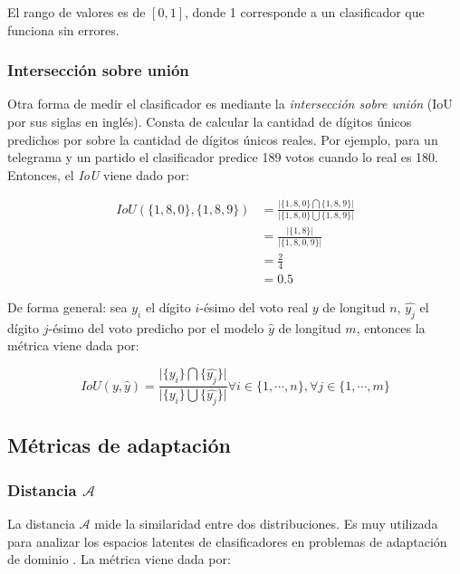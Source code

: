 \noindent
El rango de valores es de $[0, 1]$, donde 1 corresponde a un clasificador que funciona sin errores.

\subsubsection{Intersección sobre unión}

Otra forma de medir el clasificador es mediante la {\it intersección sobre unión} (IoU por sus siglas en inglés).
Consta de calcular la cantidad de dígitos únicos predichos por sobre la cantidad de dígitos únicos reales. Por ejemplo,
para un telegrama y un partido el clasificador predice 189 votos cuando lo real es 180. Entonces, el {\it IoU} viene
dado por:

\begin{align}
    IoU(\{1, 8, 0\}, \{1, 8, 9\}) & = \frac{\lvert\{1, 8, 0\} \bigcap \{1, 8, 9\}\rvert}{\lvert\{1, 8, 0\} \bigcup \{1, 8, 9\}\rvert} \nonumber \\
                                  & = \frac{\lvert\{1, 8\}\rvert}{\lvert\{1, 8, 0, 9\}\rvert}                                         \nonumber \\
                                  & = \frac{2}{4}                                                                     \nonumber                 \\
                                  & = 0.5
\end{align}

\noindent
De forma general: sea $y_{i}$ el dígito $i$-ésimo del voto real $y$ de longitud $n$, $\hat{y_{j}}$ el dígito $j$-ésimo
del voto predicho por el modelo $\hat{y}$ de longitud $m$, entonces la métrica viene dada por:

\begin{equation}
    IoU(y, \hat{y}) = \frac{\lvert \{y_{i}\} \bigcap \{\hat{y_{j}}\}\rvert}{\lvert \{y_{i}\} \bigcup \{\hat{y_{j}}\}\rvert} \forall i \in \{1, \cdots, n\}, \forall j \in \{1, \cdots, m\}
\end{equation}

\subsection{Métricas de adaptación}
\subsubsection{Distancia $\mathcal{A}$}

La distancia $\mathcal{A}$ mide la similaridad entre dos distribuciones. Es muy utilizada para analizar los espacios
latentes de clasificadores en problemas de adaptación de dominio \parencite{ben2006analysis}. La métrica viene dada por:

